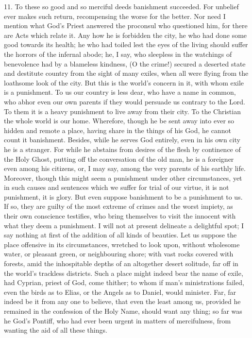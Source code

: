 11. To these so good and so merciful deeds banishment succeeded. For
unbelief ever makes such return, recompensing the worse for the
better. Nor need I mention what God's Priest answered the proconsul
who questioned him, for there are Acts which relate it. Any how he is
forbidden the city, he who had done some good towards its health; he
who had toiled lest the eyes of the living should suffer the horrors
of the infernal abode; he, I say, who sleepless in the watchings of
benevolence had by a blameless kindness, (O the crime!) secured a
deserted state and destitute country from the sight of many exiles,
when all were flying from the loathsome look of the city. But this is
the world's concern in it, with whom exile is a punishment. To us our
country is less dear, who have a name in common, who abhor even our
own parents if they would persuade us contrary to the Lord. To them it
is a heavy punishment to live away from their city. To the Christian
the whole world is our home. Wherefore, though he be sent away into
ever so hidden and remote a place, having share in the things of
his God, he cannot count it banishment. Besides, while he serves God
entirely, even in his own city he is a stranger. For while he abstains
from desires of the flesh by continence of the Holy Ghost, putting off
the conversation of the old man, he is a foreigner even among his
citizens, or, I may say, among the very parents of his earthly life.
Moreover, though this might seem a punishment under other
circumstances, yet in such causes and sentences which we suffer for
trial of our virtue, it is not punishment, it is glory. But even
suppose banishment to be a punishment to us. If so, they are guilty of
the most extreme of crimes and the worst impiety, as their own
conscience testifies, who bring themselves to visit the innocent with
what they deem a punishment. I will not at present delineate a
delightful spot; I say nothing at first of the addition of all kinds
of beauties. Let us suppose the place offensive in its circumstances,
wretched to look upon, without wholesome water, or pleasant green, or
neighbouring shore; with vast rocks covered with forests, amid the
inhospitable depths of an altogether desert solitude, far off in the
world's trackless districts. Such a place might indeed bear the name
of exile, had Cyprian, priest of God, come thither; to whom if man's
ministrations failed, even the birds as to Elias, or the Angels as to
Daniel, would minister. Far, far indeed be it from any one to believe,
that even the least among us, provided he remained in the confession
of the Holy Name, should want any thing; so far was he God's Pontiff,
who had ever been urgent in matters of mercifulness, from wanting the
aid of all these things.

